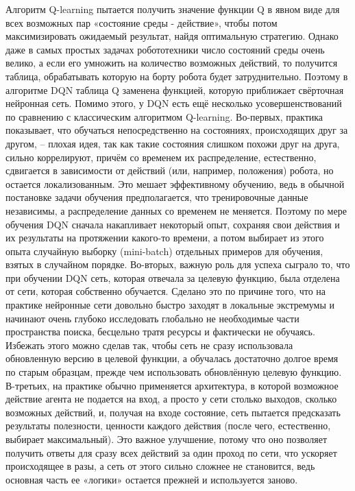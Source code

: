 Алгоритм Q-learning пытается получить значение функции Q в явном виде для всех возможных пар «состояние среды - действие», чтобы потом максимизировать ожидаемый результат, найдя оптимальную стратегию. 
Однако даже в самых простых задачах робототехники число состояний среды очень велико, а если его умножить на количество возможных действий, то получится таблица, обрабатывать которую на борту робота будет затруднительно. 
Поэтому в алгоритме DQN таблица Q заменена функцией, которую приближает свёрточная нейронная сеть. 
Помимо этого, у DQN есть ещё несколько усовершенствований по сравнению с классическим алгоритмом Q-learning. 
Во-первых, практика показывает, что обучаться непосредственно на состояниях, происходящих друг за другом, -- плохая идея, так как такие состояния слишком похожи друг на друга, сильно коррелируют, причём со временем их распределение, естественно, сдвигается в зависимости от действий (или, например, положения) робота, но остается локализованным. 
Это мешает эффективному обучению, ведь в обычной постановке задачи обучения предполагается, что тренировочные данные независимы, а распределение данных со временем не меняется. 
Поэтому по мере обучения DQN сначала накапливает некоторый опыт, сохраняя свои действия и их результаты на протяжении какого-то времени, а потом выбирает из этого опыта случайную выборку (mini-batch) отдельных примеров для обучения, взятых в случайном порядке. 
Во-вторых, важную роль для успеха сыграло то, что при обучении DQN сеть, которая отвечала за целевую функцию, была отделена от сети, которая собственно обучается. 
Сделано это по причине того, что на практике нейронные сети довольно быстро заходят в локальные экстремумы и начинают очень глубоко исследовать глобально не необходимые части пространства поиска, бесцельно тратя ресурсы и фактически не обучаясь. 
Избежать этого можно сделав так, чтобы сеть не сразу использовала обновленную версию в целевой функции, а обучалась достаточно долгое время по старым образцам, прежде чем использовать обновлённую целевую функцию. 
В-третьих, на практике обычно применяется архитектура, в которой возможное действие агента не подается на вход, а просто у сети столько выходов, сколько возможных действий, и, получая на входе состояние, сеть пытается предсказать результаты полезности, ценности каждого действия (после чего, естественно, выбирает максимальный). 
Это важное улучшение, потому что оно позволяет получить ответы для сразу всех действий за один проход по сети, что ускоряет происходящее в разы, а сеть от этого сильно сложнее не становится, ведь основная часть ее «логики» остается прежней и используется заново.

